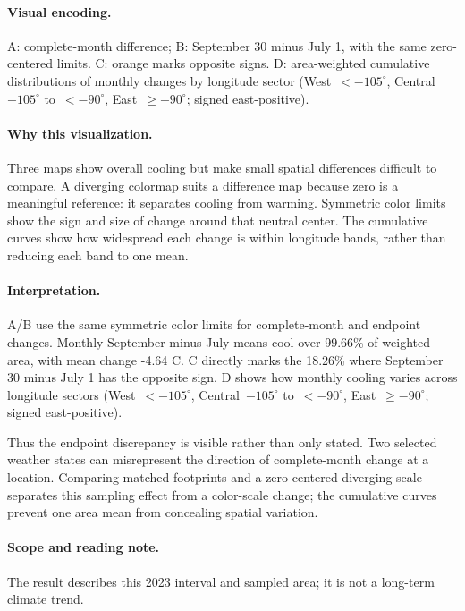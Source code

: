 \documentclass[conference,a4paper]{IEEEtran}
\begin{document}
\paragraph{Visual encoding.} A: complete-month difference; B: September 30 minus July 1, with the same zero-centered limits. C: orange marks opposite signs. D: area-weighted cumulative distributions of monthly changes by longitude sector (West~$<-105^\circ$, Central~$-105^\circ$ to~$<-90^\circ$, East~$\geq-90^\circ$; signed east-positive).



\paragraph{Why this visualization.} Three maps show overall cooling but make small spatial differences difficult to compare. A diverging colormap suits a difference map because zero is a meaningful reference: it separates cooling from warming. Symmetric color limits show the sign and size of change around that neutral center. The cumulative curves show how widespread each change is within longitude bands, rather than reducing each band to one mean.



\paragraph{Interpretation.} A/B use the same symmetric color limits for complete-month and endpoint changes. Monthly September-minus-July means cool over 99.66\% of weighted area, with mean change -4.64 C. C directly marks the 18.26\% where September 30 minus July 1 has the opposite sign. D shows how monthly cooling varies across longitude sectors (West~$<-105^\circ$, Central~$-105^\circ$ to~$<-90^\circ$, East~$\geq-90^\circ$; signed east-positive).

Thus the endpoint discrepancy is visible rather than only stated. Two selected weather states can misrepresent the direction of complete-month change at a location. Comparing matched footprints and a zero-centered diverging scale separates this sampling effect from a color-scale change; the cumulative curves prevent one area mean from concealing spatial variation.



\paragraph{Scope and reading note.} The result describes this 2023 interval and sampled area; it is not a long-term climate trend.
\end{document}
